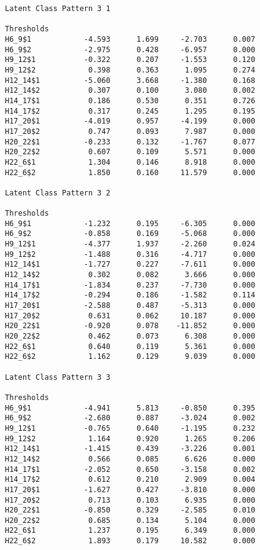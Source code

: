 \begin{verbatim}
Latent Class Pattern 3 1

Thresholds
H6_9$1            -4.593      1.699     -2.703      0.007
H6_9$2            -2.975      0.428     -6.957      0.000
H9_12$1           -0.322      0.207     -1.553      0.120
H9_12$2            0.398      0.363      1.095      0.274
H12_14$1          -5.060      3.668     -1.380      0.168
H12_14$2           0.307      0.100      3.080      0.002
H14_17$1           0.186      0.530      0.351      0.726
H14_17$2           0.317      0.245      1.295      0.195
H17_20$1          -4.019      0.957     -4.199      0.000
H17_20$2           0.747      0.093      7.987      0.000
H20_22$1          -0.233      0.132     -1.767      0.077
H20_22$2           0.607      0.109      5.571      0.000
H22_6$1            1.304      0.146      8.918      0.000
H22_6$2            1.850      0.160     11.579      0.000

Latent Class Pattern 3 2

Thresholds
H6_9$1            -1.232      0.195     -6.305      0.000
H6_9$2            -0.858      0.169     -5.068      0.000
H9_12$1           -4.377      1.937     -2.260      0.024
H9_12$2           -1.488      0.316     -4.717      0.000
H12_14$1          -1.727      0.227     -7.611      0.000
H12_14$2           0.302      0.082      3.666      0.000
H14_17$1          -1.834      0.237     -7.730      0.000
H14_17$2          -0.294      0.186     -1.582      0.114
H17_20$1          -2.588      0.487     -5.313      0.000
H17_20$2           0.631      0.062     10.187      0.000
H20_22$1          -0.920      0.078    -11.852      0.000
H20_22$2           0.462      0.073      6.308      0.000
H22_6$1            0.640      0.119      5.361      0.000
H22_6$2            1.162      0.129      9.039      0.000

Latent Class Pattern 3 3

Thresholds
H6_9$1            -4.941      5.813     -0.850      0.395
H6_9$2            -2.680      0.887     -3.024      0.002
H9_12$1           -0.765      0.640     -1.195      0.232
H9_12$2            1.164      0.920      1.265      0.206
H12_14$1          -1.415      0.439     -3.226      0.001
H12_14$2           0.566      0.085      6.626      0.000
H14_17$1          -2.052      0.650     -3.158      0.002
H14_17$2           0.612      0.210      2.909      0.004
H17_20$1          -1.627      0.427     -3.810      0.000
H17_20$2           0.713      0.103      6.935      0.000
H20_22$1          -0.850      0.329     -2.585      0.010
H20_22$2           0.685      0.134      5.104      0.000
H22_6$1            1.237      0.195      6.349      0.000
H22_6$2            1.893      0.179     10.582      0.000


\end{verbatim}
